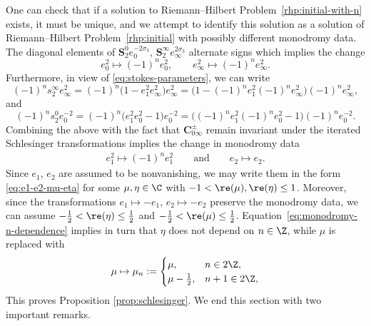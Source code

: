 One can check that if a solution to Riemann--Hilbert Problem~\ref{rhp:initial-with-n} exists, it must be unique, and we attempt to identify this solution as a solution of Riemann--Hilbert Problem~\ref{rhp:initial} with possibly different monodromy data. The diagonal elements of $\mathbf{S}_2^0 e_0^{-2\sigma_3}$, $\mathbf{S}_2^\infty e_\infty^{2\sigma_3}$ alternate signs which implies the change
\[
e_0^2 \mapsto (-1)^n e_0^2, \qquad e_\infty^2 \mapsto (-1)^n e_\infty^2.
\]
Furthermore, in view of \eqref{eq:stokes-parameters}, we can write
\[
(-1)^n s_2^\infty e_\infty^2 = (-1)^n\big(1 - e_1^2 e_\infty^2\big) e_\infty^2 = \big(1 - (-1)^ne_1^2(-1)^ne_\infty^2\big)(-1)^ne_\infty^2,
\]
and
\[
(-1)^n s_2^0 e_0^{-2} = (-1)^n\big(e_1^2 e_0^2 - 1\big) e_0^{-2} = \big((-1)^ne_1^2(-1)^ne_0^2 -1\big)(-1)^ne_0^{-2}.
\]
Combining the above with the fact that $\mathbf{C}_{0 \infty}^\pm$ remain invariant under the iterated Schlesinger transformations implies the change in monodromy data
\begin{gather} \label{eq:monodromy-n-dependence}
e_1^2 \mapsto (-1)^ne_1^2 \qquad \text{and} \qquad e_2 \mapsto e_2.
\end{gather}
Since $e_1$, $e_2$ are assumed to be nonvanishing, we may write them in the form \eqref{eq:e1-e2-mu-eta}
for some ${\mu, \eta \in \C}$ with $-1 < \re(\mu), \re(\eta) \leq 1$. Moreover, since the transformations $e_1\mapsto-e_1$, ${e_2\mapsto -e_2}$ preserve the monodromy data, we can assume $-\frac{1}{2}<\re(\eta)\le\frac{1}{2}$ and $-\frac{1}{2}<\re(\mu) \leq \frac{1}{2}$. Equation~\eqref{eq:monodromy-n-dependence} implies in turn that $\eta$ does not depend on $n \in \Z$, while $\mu$ is replaced with
\begin{equation}
\label{eq:mu-n}
\mu \mapsto \mu_n := \begin{cases} \mu, & n \in 2\Z, \\ \mu-\frac{1}{2}, & n +1 \in 2\Z, \end{cases}
\end{equation}
This proves Proposition \ref{prop:schlesinger}. We end this section with two important remarks.

